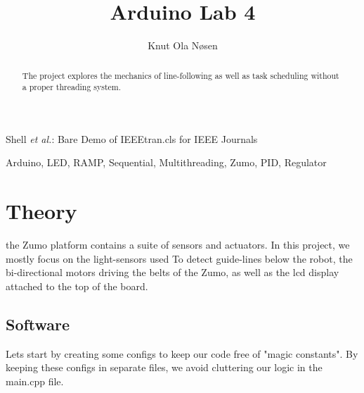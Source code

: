 \documentclass[journal]{IEEEtran}
\begin{document}
\title{Arduino Lab 4}

\author{Knut Ola Nøsen
}%

{Shell \MakeLowercase{\textit{et al.}}: Bare Demo of IEEEtran.cls for IEEE Journals}

\maketitle

\begin{abstract}
    The project explores the mechanics of line-following as well as
    task scheduling without a proper threading system.
\end{abstract}

\begin{IEEEkeywords}
    Arduino, LED, RAMP, Sequential, Multithreading, Zumo, PID, Regulator
\end{IEEEkeywords}

\section{Theory}

the Zumo platform contains a suite of sensors and actuators.
In this project, we mostly focus on the light-sensors used To
detect guide-lines below the robot, the bi-directional motors
driving the belts of the Zumo, as well as the lcd display attached
to the top of the board.


\subsection{Software}
Lets start by creating some configs to keep our code free of "magic constants".
By keeping these configs in separate files, we avoid cluttering our logic in the main.cpp file.\\




\vfill\null
\pagebreak
\end{document}
